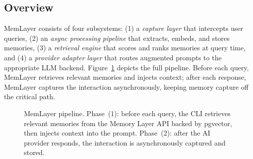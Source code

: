 \documentclass[10pt,twocolumn]{article}
\begin{document}
\subsection{Overview}

\noindent
MemLayer consists of four subsystems: (1) a \emph{capture layer} that
intercepts user queries, (2) an \emph{async processing pipeline} that extracts,
embeds, and stores memories, (3) a \emph{retrieval engine} that scores and
ranks memories at query time, and (4) a \emph{provider adapter layer} that
routes augmented prompts to the appropriate LLM backend.
Figure~\ref{fig:architecture} depicts the full pipeline. Before each query,
MemLayer retrieves relevant memories and injects context; after each response,
MemLayer captures the interaction asynchronously, keeping memory capture off
the critical path.

\begin{figure}[t]
\centering
{}
\caption{MemLayer pipeline. Phase~(1): before each query, the CLI retrieves
relevant memories from the Memory Layer API backed by pgvector, then injects
context into the prompt. Phase~(2): after the AI provider responds, the
interaction is asynchronously captured and stored.}
\label{fig:architecture}
\end{figure}
\end{document}
